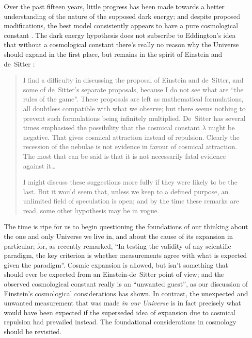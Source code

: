 \documentclass[12 pt]{article}
\begin{document}
Over the past fifteen years, little progress has been made towards a better understanding of the nature of the supposed dark energy; and despite proposed modifications, the best model consistently appears to have a pure cosmological constant \citep{Riess2004,Riess2007,Davis2007,Hicken2009,Riess2011,Suzuki2012,Hinshaw2013,Ade2013}. The dark energy hypothesis does not subscribe to Eddington's idea that without a cosmological constant there's really no reason why the Universe should expand in the first place, but remains in the spirit of Einstein and de~Sitter \citep{Eddington1933}:
\begin{quote}
I find a difficulty in discussing the proposal of Einstein and de~Sitter, and some of de~Sitter's separate proposals, because I do not see what are ``the rules of the game''. These proposals are left as mathematical formulations, all doubtless compatible with what we observe; but there seems nothing to prevent such formulations being infinitely multiplied. De~Sitter has several times emphasised the possibility that the cosmical constant $\lambda$ might be negative. That gives cosmical attraction instead of repulsion. Clearly the recession of the nebulae is not evidence in favour of cosmical attraction. The most that can be said is that it is not necessarily fatal evidence against it\ldots

I might discuss these suggestions more fully if they were likely to be the last. But it would seem that, unless we keep to a defined purpose, an unlimited field of speculation is open; and by the time these remarks are read, some other hypothesis may be in vogue.
\end{quote}

The time is ripe for us to begin questioning the foundations of our thinking about the one and only Universe we live in, and about the cause of its expansion in particular; for, as \citet{Ijjas2013} recently remarked, ``In testing the validity of any scientific paradigm, the key criterion is whether measurements agree with what is expected given the paradigm''. Cosmic expansion is allowed, but isn't something that should ever be expected from an Einstein-de~Sitter point of view; and the observed cosmological constant really is an ``unwanted guest'', as our discussion of Einstein's cosmological considerations has shown. In contrast, the unexpected and unwanted measurement that was made \textit{in our Universe} is in fact precisely what would have been expected if the superseded idea of expansion due to cosmical repulsion had prevailed instead. The foundational considerations in cosmology should be revisited.
\end{document}
